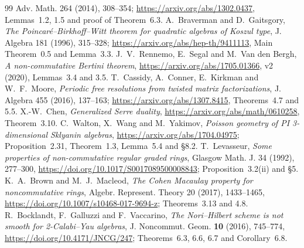 \documentclass[11pt,a4paper]{ltjsarticle}
\begin{document}
\begin{thebibliography}{99}
Adv. Math. 264 (2014), 308--354;
\url{https://arxiv.org/abs/1302.0437},
Lemmas~1.2, 1.5 and proof of Theorem~6.3.
A.~Braverman and D.~Gaitsgory,
\emph{The Poincar\'e--Birkhoff--Witt theorem for quadratic algebras of Koszul type},
J. Algebra 181 (1996), 315--328;
\url{https://arxiv.org/abs/hep-th/9411113}, Main Theorem~0.5 and Lemma~3.3.
J.~V.~Rennemo, E.~Segal and M.~Van den Bergh,
\emph{A non-commutative Bertini theorem},
\url{https://arxiv.org/abs/1705.01366}, v2 (2020), Lemmas~3.4 and 3.5.
T.~Cassidy, A.~Conner, E.~Kirkman and W.~F.~Moore,
\emph{Periodic free resolutions from twisted matrix factorizations},
J. Algebra 455 (2016), 137--163;
\url{https://arxiv.org/abs/1307.8415}, Theorems~4.7 and 5.5.
X.-W.~Chen, \emph{Generalized Serre duality},
\url{https://arxiv.org/abs/math/0610258}, Theorem~3.10.
C.~Walton, X.~Wang and M.~Yakimov,
\emph{Poisson geometry of PI 3-dimensional Sklyanin algebras},
\url{https://arxiv.org/abs/1704.04975};
Proposition~2.31, Theorem~1.3, Lemma~5.4 and \S8.2.
T.~Levasseur,
\emph{Some properties of non-commutative regular graded rings},
Glasgow Math. J. 34 (1992), 277--300,
\url{https://doi.org/10.1017/S0017089500008843};
Proposition~3.2(ii) and \S5.
K.~A.~Brown and M.~J.~Macleod,
\emph{The Cohen Macaulay property for noncommutative rings},
Algebr. Represent. Theory 20 (2017), 1433--1465,
\url{https://doi.org/10.1007/s10468-017-9694-z};
Theorems~3.13 and 4.8.
R.~Bocklandt, F.~Galluzzi and F.~Vaccarino,
\emph{The Nori--Hilbert scheme is not smooth for 2-Calabi--Yau algebras},
J. Noncommut. Geom. \textbf{10} (2016), 745--774,
\url{https://doi.org/10.4171/JNCG/247};
Theorems~6.3, 6.6, 6.7 and Corollary~6.8.
\end{thebibliography}
\end{document}
